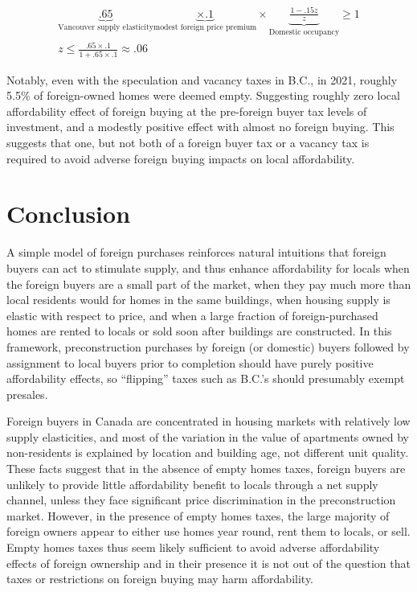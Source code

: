\documentclass[12pt]{article}
\begin{document}
\begin{align}
	\underbrace{.65}_{\text{Vancouver supply elasticity}} \underbrace{\times .1}_{\text{modest foreign price premium}} \times \underbrace{\frac{1-.15 z}{z}}_{\text{Domestic occupancy}} \geq 1\\
	 z \leq \frac{.65 \times .1}{1+.65 \times .1} \approx .06
 \end{align}

Notably, even with the speculation and vacancy taxes in B.C., in 2021, roughly 5.5\% of foreign-owned homes were deemed empty. Suggesting roughly zero local affordability effect of foreign buying at the pre-foreign buyer tax levels of investment, and a modestly positive effect with almost no foreign buying. This suggests that one, but not both of a foreign buyer tax or a vacancy tax is required to avoid adverse foreign buying impacts on local affordability.

\section{Conclusion}

A simple model of foreign purchases reinforces natural intuitions that foreign
buyers can act to stimulate supply, and thus enhance affordability for locals
when the foreign buyers are a small part of the market, when they pay 
much more than local residents would for homes in the same buildings, when
housing supply is elastic with respect to price, and when a large fraction of
foreign-purchased homes are rented to locals or sold soon after buildings are
constructed. In this framework, preconstruction purchases by foreign (or
domestic) buyers followed by assignment to local buyers prior to completion
should have purely positive affordability effects, so ``flipping'' taxes such
as B.C.'s should presumably exempt presales.

Foreign buyers in Canada are concentrated in housing markets with relatively
low supply elasticities, and most of the variation in the value of apartments
owned by non-residents is explained by location and building age, not different
unit quality. These facts suggest that in the absence of empty homes taxes,
foreign buyers are unlikely to provide little affordability benefit to locals
through a net supply channel, unless they face significant price discrimination
in the preconstruction market. However, in the presence of empty homes taxes,
the large majority of foreign owners appear to either use homes year round,
rent them to locals, or sell. Empty homes taxes thus seem likely sufficient to
avoid adverse affordability effects of foreign ownership and in their presence
it is not out of the question that taxes or restrictions on foreign buying may
harm affordability.

\printbibliography
\end{document}
